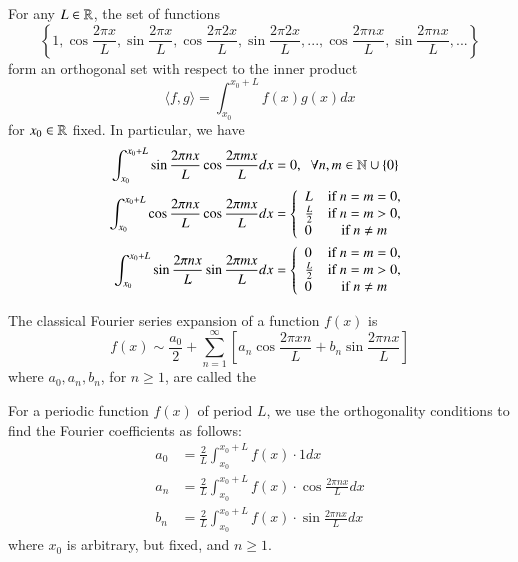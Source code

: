 \documentclass[12pt, a4paper, oneside, openright, titlepage]{book}
\begin{document}
\begin{prop}
    For any $L \in \mathbb R$, the set of functions \begin{equation*}
        \left\{1,\cos\frac{2\pi x}{L},\sin\frac{2\pi x}{L},\cos\frac{2\pi 2x}{L},\sin\frac{2\pi 2x}{L},...,\cos\frac{2\pi nx}{L},\sin\frac{2\pi nx}{L},...\right\}
    \end{equation*}
    form an orthogonal set with respect to the inner product \begin{equation*}
        \langle f,g\rangle = \int_{x_0}^{x_0+L}f(x)g(x)dx
    \end{equation*}
    for $x_0 \in \mathbb R$ fixed. In particular, we have \begin{align*}
        \int_{x_0}^{x_0+L}\sin\frac{2\pi nx}{L}\cos\frac{2\pi mx}{L}dx &= 0,\;\;\forall n,m \in \mathbb N\cup \{0\} \\
        \int_{x_0}^{x_0+L}\cos\frac{2\pi nx}{L}\cos\frac{2\pi mx}{L}dx &= \left\{\begin{array}{lc} L & \text{if } n = m = 0, \\ \frac{L}{2} & \text{if } n = m > 0, \\ 0 & \text{if } n \neq m \end{array}\right. \\
        \int_{x_0}^{x_0+L}\sin\frac{2\pi nx}{L}\sin\frac{2\pi mx}{L}dx &= \left\{\begin{array}{lc} 0 & \text{if } n = m = 0, \\ \frac{L}{2} & \text{if } n = m > 0, \\ 0 & \text{if } n \neq m \end{array}\right. \\
    \end{align*}
\end{prop}


\begin{defn}
    The classical Fourier series expansion of a function $f(x)$ is \begin{equation}
        f(x) \sim \frac{a_0}{2} + \sum_{n=1}^{\infty}\left[a_n\cos\frac{2\pi xn}{L}+b_n\sin\frac{2\pi nx}{L}\right]
    \end{equation}
    where $a_0,a_n,b_n$, for $n \geq 1$, are called the 
\end{defn}

For a periodic function $f(x)$ of period $L$, we use the orthogonality conditions to find the Fourier coefficients as follows: \begin{align}
    a_0 &= \frac{2}{L}\int_{x_0}^{x_0+L}f(x)\cdot 1dx \\
    a_n &= \frac{2}{L}\int_{x_0}^{x_0+L}f(x)\cdot \cos\frac{2\pi nx}{L}dx \\
    b_n &= \frac{2}{L}\int_{x_0}^{x_0+L}f(x)\cdot \sin\frac{2\pi nx}{L}dx
\end{align}
where $x_0$ is arbitrary, but fixed, and $n \geq 1$.
\end{document}
